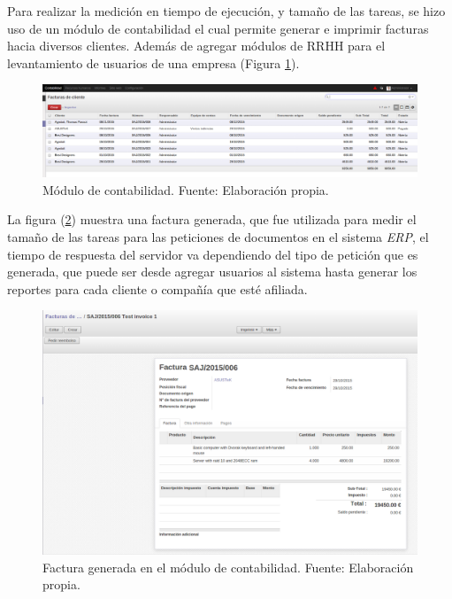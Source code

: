 \newpage
Para realizar la medición en tiempo de ejecución, y tamaño de las tareas, se hizo uso de un módulo de contabilidad el cual permite generar e imprimir facturas hacia diversos clientes. Además de agregar módulos de RRHH para el levantamiento de usuarios de una empresa (Figura \ref{fig:ContOdoo}).

\renewcommand\thefigure{\arabic{figure}}
\begin{figure}[h!]
	\centering
	\includegraphics[scale=0.2]{media/odoo/3}
	\caption{Módulo de contabilidad. Fuente: Elaboración propia.}
	\label{fig:ContOdoo}
\end{figure}

La figura (\ref{fig:factOdoo}) muestra una factura generada, que fue utilizada para medir el tamaño de las tareas para las peticiones de documentos en el sistema \textit{ERP}, el tiempo de respuesta del servidor va dependiendo del tipo de petición que es generada, que puede ser desde agregar usuarios al sistema hasta generar los reportes para cada cliente o compañía que esté afiliada.

\newpage

\renewcommand\thefigure{\arabic{figure}}
\begin{figure}[h!]
	\centering
	\includegraphics[scale=0.2]{media/odoo/4}
	\caption{Factura generada en el módulo de contabilidad. Fuente: Elaboración propia.}
	\label{fig:factOdoo}
\end{figure}

